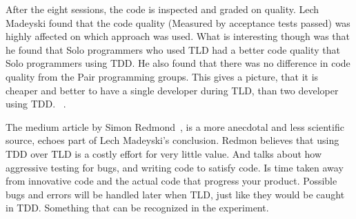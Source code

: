 After the eight sessions, the code is inspected and graded on quality. 
Lech Madeyski found that the code quality (Measured by acceptance tests passed) 
was highly affected on which approach was used. 
What is interesting though was that he found that Solo programmers who used TLD had a better 
code quality that Solo programmers using TDD. He also found that there was no difference in code 
quality from the Pair programming groups. This gives a picture, that it is cheaper and better to have a 
single developer during TLD, than two developer using TDD. ~\cite{lm2005}.



The medium article by Simon Redmond~\cite{sr2019}, 
is a more anecdotal and less scientific source, echoes part of Lech Madeyski’s conclusion.
Redmon believes that using TDD over TLD is a costly effort for very little value. 
And talks about how aggressive testing for bugs, and writing code to satisfy code. 
Is time taken away from innovative code and the actual code that progress your product. 
Possible bugs and errors will be handled later when TLD, just like they would be caught in TDD. 
Something that can be recognized in the experiment. \newline

